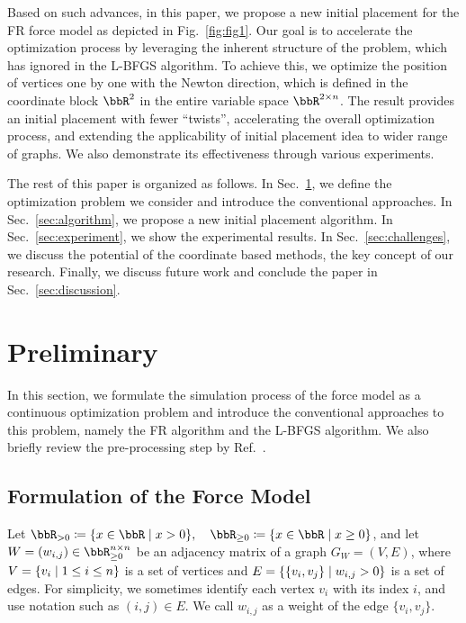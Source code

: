 \documentclass[dvipdfmx,10pt,journal,compsoc]{IEEEtran}
\newcommand{\defeq}{\coloneqq}
\begin{document}
Based on such advances, in this paper, we propose a new initial placement for the FR force model as depicted in Fig.~\ref{fig:fig1}.
Our goal is to accelerate the optimization process by leveraging the inherent structure of the problem, which has ignored in the L-BFGS algorithm.
To achieve this, we optimize the position of vertices one by one with the Newton direction, which is defined in the coordinate block $\bbR^2$ in the entire variable space $\bbR^{2 \times n}$.
The result provides an initial placement with fewer ``twists'', accelerating the overall optimization process, and extending the applicability of initial placement idea to wider range of graphs.
We also demonstrate its effectiveness through various experiments.

The rest of this paper is organized as follows.
In Sec.~\ref{sec:preliminary}, we define the optimization problem we consider and introduce the conventional approaches.
In Sec.~\ref{sec:algorithm}, we propose a new initial placement algorithm.
In Sec.~\ref{sec:experiment}, we show the experimental results.
In Sec.~\ref{sec:challenges}, we discuss the potential of the coordinate based methods, the key concept of our research.
Finally, we discuss future work and conclude the paper in Sec.~\ref{sec:discussion}.

\section{Preliminary}\label{sec:preliminary}

In this section, we formulate the simulation process of the force model as a continuous optimization problem and introduce the conventional approaches to this problem, namely the FR algorithm and the L-BFGS algorithm. We also briefly review the pre-processing step by Ref.~\cite{ghassemitoosiSimulatedAnnealingPreProcessing2016}.

\subsection{Formulation of the Force Model}\label{ssec:forceModel}

Let $\bbR_{> 0} \defeq \qty{ x \in \bbR \mid x > 0 }, \quad \bbR_{\geq 0} \defeq \qty{ x \in \bbR \mid x \geq 0 }$, and let $W = (w_{i,j}) \in \bbR_{\geq 0}^{n \times n}$ be an adjacency matrix of a graph $G_W = (V, E)$, where $V = \qty{v_i \mid 1 \leq i \leq n}$ is a set of vertices and $E = \qty{\{v_i, v_j\} \mid w_{i,j} > 0}$ is a set of edges.
For simplicity, we sometimes identify each vertex $v_i$ with its index $i$, and use notation such as $(i, j) \in E$.
We call $w_{i,j}$ as a weight of the edge $\{v_i,v_j\}$.
\end{document}
